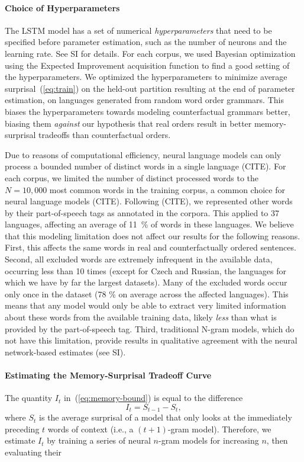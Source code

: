 \paragraph{Choice of Hyperparameters}

The LSTM model has a set of numerical \emph{hyperparameters} that need to be specified before parameter estimation, such as the number of neurons and the learning rate.
See SI for details.
For each corpus, we used Bayesian optimization using the Expected Improvement acquisition function \citep{snoek-practical-2012} to find a good setting of the hyperparameters.
We optimized the hyperparameters to minimize average surprisal~(\ref{eq:train}) on the held-out partition resulting at the end of parameter estimation, on languages generated from random word order grammars.
This biases the hyperparameters towards modeling counterfactual grammars better, biasing them \emph{against} our hypothesis that real orders result in better memory-surprisal tradeoffs than counterfactual orders.

Due to reasons of computational efficiency, neural language models can only process a bounded number of distinct words in a single language (CITE).
For each corpus, we limited the number of distinct processed words to the $N=10,000$ most common words in the training corpus, a common choice for neural language models (CITE).
Following (CITE), we represented other words by their part-of-speech tags as annotated in the corpora.
This applied to 37 languages, affecting an average of 11~\% of words in these languages.
We believe that this modeling limitation does not affect our results for the following reasons.
First, this affects the same words in real and counterfactually ordered sentences.
Second, all excluded words are extremely infrequent in the available data, occurring less than 10 times (except for Czech and Russian, the languages for which we have by far the largest datasets).
Many of the excluded words occur only once in the dataset (78 \% on average across the affected languages).
This means that any model would only be able to extract very limited information about these words from the available training data, likely \emph{less} than what is provided by the part-of-speech tag.
Third, traditional N-gram models, which do not have this limitation, provide results in qualitative agreement with the neural network-based estimates (see SI).




\paragraph{Estimating the Memory-Surprisal Tradeoff Curve}
The quantity $I_t$ in~(\ref{eq:memory-bound}) is equal to the difference 
\begin{equation}
I_t = S_{t-1} - S_t,
\end{equation}
where $S_t$ is the average surprisal of a model that only looks at the immediately preceding $t$ words of context (i.e., a $(t+1)$-gram model). Therefore, we estimate $I_t$ by training a series of neural $n$-gram models for increasing $n$, then evaluating their 



